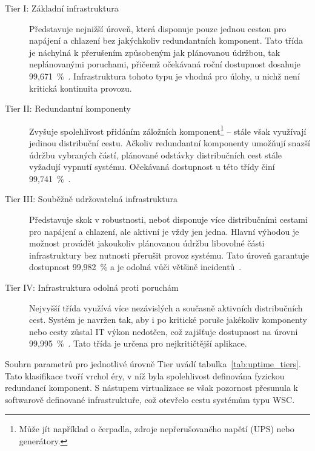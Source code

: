 \begin{description}
    \item[Tier I: Základní infrastruktura] Představuje nejnižší úroveň, která disponuje pouze jednou cestou pro napájení a chlazení bez jakýchkoliv redundantních komponent. Tato třída je náchylná k přerušením způsobeným jak plánovanou údržbou, tak neplánovanými poruchami, přičemž očekávaná roční dostupnost dosahuje 99,671~\%~\cite{turner_iv_tier_2006}. Infrastruktura tohoto typu je vhodná pro úlohy, u nichž není kritická kontinuita provozu.
    
    \item[Tier II: Redundantní komponenty] Zvyšuje spolehlivost přidáním záložních komponent\footnote{Může jít například o čerpadla, zdroje nepřerušovaného napětí (UPS) nebo generátory.} -- stále však využívají jedinou distribuční cestu. Ačkoliv redundantní komponenty umožňují snazší údržbu vybraných částí, plánované odstávky distribučních cest stále vyžadují vypnutí systému. Očekávaná dostupnost u této třídy činí 99,741~\%~\cite{turner_iv_tier_2006}.
    
    \item[Tier III: Souběžně udržovatelná infrastruktura] Představuje skok v robustnosti, neboť disponuje více distribučními cestami pro napájení a chlazení, ale aktivní je vždy jen jedna. Hlavní výhodou je možnost provádět jakoukoliv plánovanou údržbu libovolné části infrastruktury bez nutnosti přerušit provoz systému. Tato úroveň garantuje dostupnost 99,982~\% a je odolná vůči většině incidentů~\cite{turner_iv_tier_2006}.

    \item[Tier IV: Infrastruktura odolná proti poruchám] Nejvyšší třída využívá více nezávislých a současně aktivních distribučních cest. Systém je navržen tak, aby i po kritické poruše jakékoliv komponenty nebo cesty zůstal IT výkon nedotčen, což zajišťuje dostupnost na úrovni 99,995~\%~\cite{turner_iv_tier_2006}. Tato třída je určena pro nejkritičtější aplikace.
\end{description}

Souhrn parametrů pro jednotlivé úrovně Tier uvádí tabulka~\ref{tab:uptime_tiers}. Tato klasifikace tvoří vrchol éry, v níž byla spolehlivost definována fyzickou redundancí komponent. S nástupem virtualizace se však pozornost přesunula k softwarově definované infrastruktuře, což otevřelo cestu systémům typu WSC.


